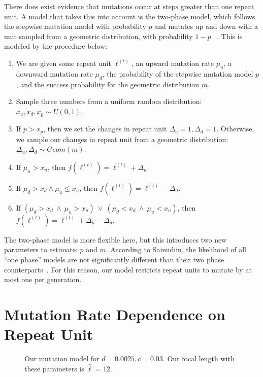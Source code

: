 There does exist evidence that mutations occur at steps greater than one repeat unit.
A model that takes this into account is the two-phase model, which follows the stepwise mutation model with probability
$p$ and mutates up and down with a unit sampled from a geometric distribution, with probability $1-p$
~\cite{dirienzoMutationalProcessesSimplesequence1994}.
This is modeled by the procedure below:
\begin{enumerate}
    \item We are given some repeat unit $\ell^{(t)}$, an upward mutation rate $\mu_u$, a
        downward mutation rate $\mu_d$, the probability of the stepwise mutation model $p$, and the success probability
        for the geometric distribution $m$.
    \item Sample three numbers from a uniform random distribution: $x_u, x_d, x_p \sim U(0, 1)$.
    \item If $p > x_p$, then we set the changes in repeat unit $\Delta_u = 1, \Delta_d = 1$.
        Otherwise, we sample our changes in repeat unit from a geometric distribution:
        $\Delta_u, \Delta_d \sim \mathit{Geom}(m)$.
    \item If $\mu_u > x_u$, then $f(\ell^{(t)}) = \ell^{(t)} + \Delta_u$.
    \item If $\mu_d > x_d \land \mu_u \leq x_u$, then $f(\ell^{(t)}) = \ell^{(t)} - \Delta_d$.
    \item If $(\mu_d > x_d \ \land \ \mu_u > x_u) \ \lor \ (\mu_d < x_d \ \land \ \mu_u < x_u)$,
        then $f(\ell^{(t)}) = \ell^{(t)} + \Delta_u - \Delta_d$.
\end{enumerate}

The two-phase model is more flexible here, but this introduces two new parameters to estimate: $p$ and $m$.
According to Sainudiin, the likelihood of all ``one phase'' models are
not significantly different than their two phase counterparts~\cite{sainudiinMicrosatelliteMutationModels2004}.
For this reason, our model restricts repeat units to mutate by at most one per generation.

\section{Mutation Rate Dependence on Repeat Unit}\label{sec:mutationRateDependenceOnRepeatUnit}
\begin{figure}[t]
    \centering{}
    \caption{Our mutation model for $d=0.0025, c=0.03$.
    Our focal length with these parameters is $\hat{\ell}=12$.}\label{fig:mutationModel}
\end{figure}

